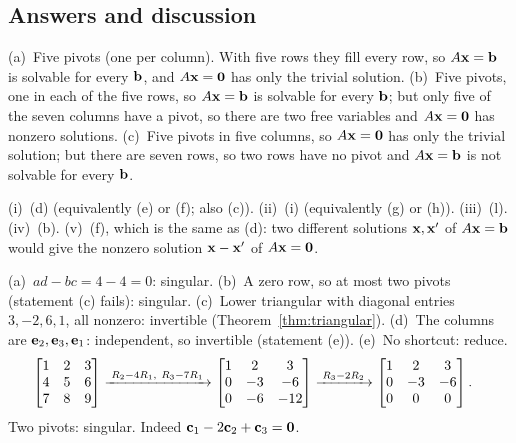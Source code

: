 \documentclass[11pt]{article}
\begin{document}
\subsection*{Answers and discussion}
\begin{description}[leftmargin=0pt,itemsep=5pt]
  \item[Knowledge Check \ref{kc:pivotcount}.] (a)~Five pivots (one per column). With five rows they fill every row, so $A\mathbf{x}=\mathbf{b}$ is solvable for every $\mathbf{b}$, and $A\mathbf{x}=\mathbf{0}$ has only the trivial solution. (b)~Five pivots, one in each of the five rows, so $A\mathbf{x}=\mathbf{b}$ is solvable for every $\mathbf{b}$; but only five of the seven columns have a pivot, so there are two free variables and $A\mathbf{x}=\mathbf{0}$ has nonzero solutions. (c)~Five pivots in five columns, so $A\mathbf{x}=\mathbf{0}$ has only the trivial solution; but there are seven rows, so two rows have no pivot and $A\mathbf{x}=\mathbf{b}$ is not solvable for every $\mathbf{b}$.
  \item[Knowledge Check \ref{kc:sort}.] (i)~(d) (equivalently (e) or (f); also (c)). (ii)~(i) (equivalently (g) or (h)). (iii)~(l). (iv)~(b). (v)~(f), which is the same as (d): two different solutions $\mathbf{x},\mathbf{x}'$ of $A\mathbf{x}=\mathbf{b}$ would give the nonzero solution $\mathbf{x}-\mathbf{x}'$ of $A\mathbf{x}=\mathbf{0}$.
  \item[Knowledge Check \ref{kc:cheapest}.] (a)~$ad-bc=4-4=0$: singular. (b)~A zero row, so at most two pivots (statement (c) fails): singular. (c)~Lower triangular with diagonal entries $3,-2,6,1$, all nonzero: invertible (Theorem~\ref{thm:triangular}). (d)~The columns are $\mathbf{e}_2,\mathbf{e}_3,\mathbf{e}_1$: independent, so invertible (statement (e)). (e)~No shortcut: reduce.
  \begin{align*}
  \begin{bmatrix}1&2&3\\4&5&6\\7&8&9\end{bmatrix}
  &\xrightarrow{\;R_2-4R_1,\ R_3-7R_1\;}
  \begin{bmatrix}1&2&3\\0&-3&-6\\0&-6&-12\end{bmatrix}
  \xrightarrow{\;R_3-2R_2\;}
  \begin{bmatrix}1&2&3\\0&-3&-6\\0&0&0\end{bmatrix}.
  \end{align*}
  Two pivots: singular. Indeed $\mathbf{c}_1-2\mathbf{c}_2+\mathbf{c}_3=\mathbf{0}$.
  \item[Knowledge Check \ref{kc:param}.]

\end{description}
\end{document}
